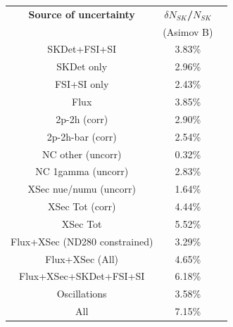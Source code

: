 \begin{table}[htb]
\centering
\begin{tabular}{| c | c | c |}
\hline
  {\bf Source of uncertainty}    & \multicolumn{1}{c|}{{\bf ${\delta}N_{SK}$/$N_{SK}$}}\\
                                 & \multicolumn{1}{c|}{(Asimov B)}\\

\hline
\hline  
SKDet+FSI+SI                   & 3.83\%                        \\
SKDet only                   & 2.96\%                        \\
FSI+SI only                   & 2.43\%                        \\
\hline
  Flux                           & 3.85\%                        \\
\hline
\hline
  2p-2h (corr)                     & 2.90\%                        \\
  2p-2h-bar (corr)                  & 2.54\%                        \\
  NC other (uncorr)              & 0.32\%                        \\
  NC 1gamma (uncorr)             & 2.83\%                        \\
  XSec nue/numu (uncorr)                 & 1.64\%                        \\
\hline  
  XSec Tot (corr)                  & 4.44\%                        \\
  XSec Tot                       & 5.52\%                        \\
\hline
\hline
 Flux+XSec (ND280 constrained)                      & 3.29\%                        \\
 Flux+XSec (All)	                     & 4.65\%                        \\
\hline
\hline
  Flux+XSec+SKDet+FSI+SI         & 6.18\%                        \\
\hline
\hline
  Oscillations                   & 3.58\%                        \\
\hline
\hline
  All                            & 7.15\%                        \\
\hline
\hline


\end{tabular}
\end{table}
